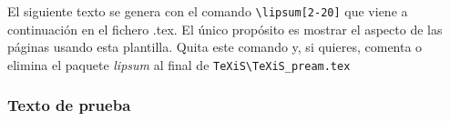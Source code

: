 El siguiente texto se genera con el comando \verb|\lipsum[2-20]| que viene a continuación en el fichero .tex. El único propósito es mostrar el aspecto de las páginas usando esta plantilla. Quita este comando y, si quieres, comenta o elimina el paquete \textit{lipsum} al final de \verb|TeXiS\TeXiS_pream.tex|

\subsubsection{Texto de prueba}


\lipsum[2-20]
